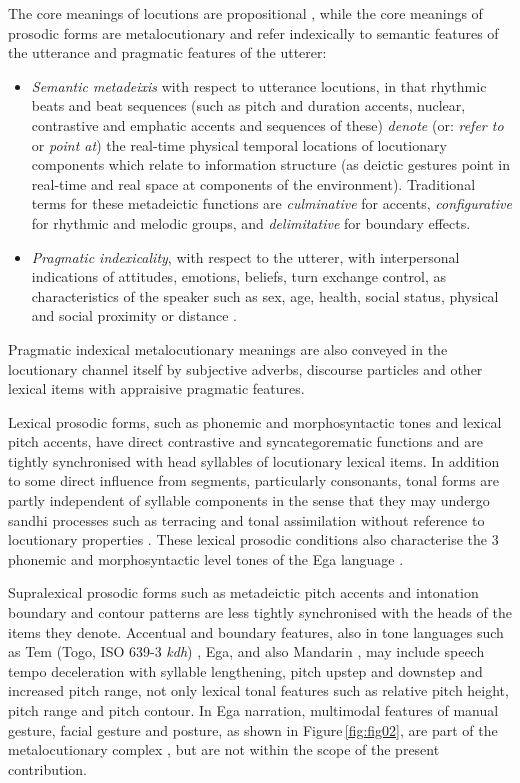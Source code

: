 \documentclass[output=paper,colorlinks,citecolor=brown
]{langscibook}
\begin{document}
The core meanings of locutions are propositional \cite{austin1962}, while the core meanings of prosodic forms are metalocutionary \cite{gibbon1976, gibbonmetalocution1981} and refer indexically to semantic features of the utterance and pragmatic features of the utterer:
\begin{itemize}
\item \textit{Semantic metadeixis} with respect to utterance locutions, in that rhythmic beats and beat sequences (such as pitch and duration accents, nuclear, contrastive and emphatic accents and sequences of these) \textit{denote} (or: \textit{refer to} or \textit{point at}) the real-time physical temporal locations of locutionary components which relate to information structure (as deictic gestures point in real-time and real space at components of the environment). Traditional terms for these metadeictic functions are \textit{culminative} for accents, \textit{configurative} for rhythmic and melodic groups, and \textit{delimitative} for boundary effects.
\item \textit{Pragmatic indexicality}, with respect to the utterer, with interpersonal indications of attitudes, emotions, beliefs, turn exchange control, as characteristics of the speaker such as sex, age, health, social status, physical and social proximity or distance \cite{gibbon1976, hirschbergpierrehumbert1986}.
\end{itemize}
Pragmatic indexical metalocutionary meanings are also conveyed in the locutionary channel itself by subjective adverbs, discourse particles and other lexical items with appraisive pragmatic features.

Lexical prosodic forms, such as phonemic and morphosyntactic tones and lexical pitch accents, have direct contrastive and syncategorematic functions and are tightly synchronised with head syllables of locutionary lexical items. In addition to some direct influence from segments, particularly consonants, tonal forms are partly independent of syllable components in the sense that they may undergo sandhi processes such as terracing and tonal assimilation without reference to locutionary properties \cite{gibbonfstone1987, jansche1998}. These lexical prosodic conditions also characterise the 3 phonemic and morphosyntactic level tones of the Ega language \cite{connellahouagibbon2002}.

Supralexical prosodic forms such as metadeictic pitch accents and intonation boundary and contour patterns are less tightly synchronised with the heads of the items they denote. Accentual and boundary features, also in tone languages such as Tem (Togo, ISO 639-3 \textit{kdh}) \cite{tchagbale2001}, Ega, and also Mandarin \cite{duanmu2007}, may include speech tempo deceleration with syllable lengthening, pitch upstep and downstep and increased pitch range, not only lexical tonal features such as relative pitch height, pitch range and pitch contour. In Ega narration, multimodal features of manual gesture, facial gesture and posture, as shown in Figure\,\ref{fig:fig02}, are part of the metalocutionary complex \cite{rossinigibbon2011}, but are not within the scope of the present contribution.
\end{document}
